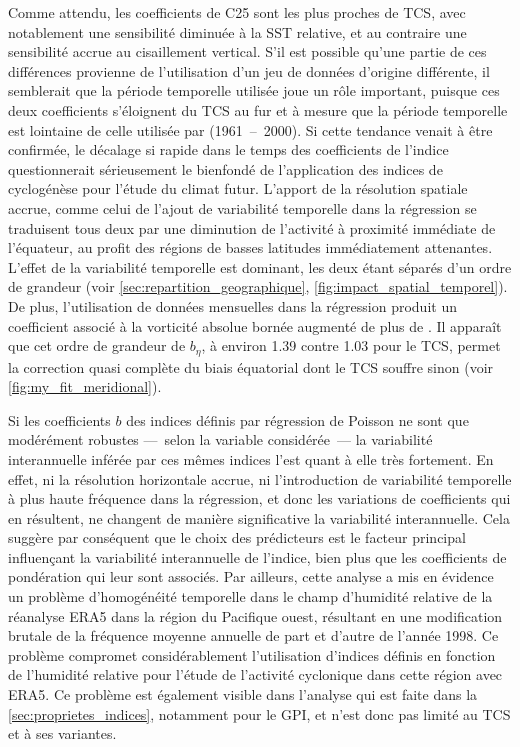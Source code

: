 \documentclass[../main.tex]{subfiles}
\begin{document}
Comme attendu, les coefficients de C25 sont les plus proches de TCS, avec notablement une sensibilité diminuée à la SST relative, et au contraire une
sensibilité accrue au cisaillement vertical. S'il est possible qu'une partie de ces différences provienne de l'utilisation d'un jeu de données d'origine
différente, il semblerait que la période temporelle utilisée joue un rôle important, puisque ces deux coefficients s'éloignent du TCS au fur et à mesure que la
période temporelle est lointaine de celle utilisée par \textcite{tippett_poisson_2011} (\num{1961}~--~\num{2000}). Si cette tendance venait à être confirmée, le
décalage si rapide dans le temps des coefficients de l'indice questionnerait sérieusement le bienfondé de l'application des indices de cyclogénèse pour l'étude
du climat futur. L'apport de la résolution spatiale accrue, comme celui de l'ajout de variabilité temporelle dans la régression se traduisent tous deux par une
diminution de l'activité à proximité immédiate de l'équateur, au profit des régions de basses latitudes immédiatement attenantes. L'effet de la variabilité
temporelle est dominant, les deux étant séparés d'un ordre de grandeur (voir \cref{sec:repartition_geographique}, \cref{fig:impact_spatial_temporel}). De plus,
l'utilisation de données mensuelles dans la régression produit un coefficient associé à la vorticité absolue bornée augmenté de plus de . Il apparaît
que cet ordre de grandeur de $b_\eta$, à environ \num{1.39} contre \num{1.03} pour le TCS, permet la correction quasi complète du biais équatorial dont le TCS
souffre sinon (voir \cref{fig:my_fit_meridional}).

Si les coefficients $b$ des indices définis par régression de Poisson ne sont que modérément robustes ---~selon la variable considérée~--- la variabilité
interannuelle inférée par ces mêmes indices l'est quant à elle très fortement. En effet, ni la résolution horizontale accrue, ni l'introduction de variabilité
temporelle à plus haute fréquence dans la régression, et donc les variations de coefficients qui en résultent, ne changent de manière significative la
variabilité interannuelle. Cela suggère par conséquent que le choix des prédicteurs est le facteur principal influençant la variabilité interannuelle de
l'indice, bien plus que les coefficients de pondération qui leur sont associés. Par ailleurs, cette analyse a mis en évidence un problème d'homogénéité
temporelle dans le champ d'humidité relative de la réanalyse ERA5 dans la région du Pacifique ouest, résultant en une modification brutale de la fréquence
moyenne annuelle de part et d'autre de l'année \num{1998}. Ce problème compromet considérablement l'utilisation d'indices définis en fonction de l'humidité
relative pour l'étude de l'activité cyclonique dans cette région avec ERA5. Ce problème est également visible dans l'analyse qui est faite dans la
\cref{sec:proprietes_indices}, notamment pour le GPI, et n'est donc pas limité au TCS et à ses variantes.
\end{document}
